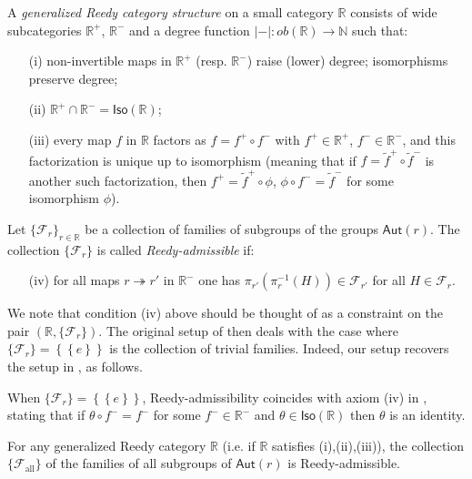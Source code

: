 \documentclass[a4paper,10pt
 ,draft
]{article}%
\begin{document}
\begin{definition}\label{GENRED DEF}
A \textit{generalized Reedy category structure} on a
small category $\mathbb{R}$ consists of
wide subcategories 
$\mathbb{R}^+$, $\mathbb{R}^-$
and a degree function $|\minus| \colon ob(\mathbb{R}) \to \mathbb{N}$ such that:
\begin{itemize}
	\item[(i)] non-invertible maps in $\mathbb{R}^+$ (resp. $\mathbb{R}^-$) raise (lower) degree; isomorphisms preserve degree;
	\item[(ii)] $\mathbb{R}^+ \cap \mathbb{R}^- = \mathsf{Iso}(\mathbb{R})$;
	\item[(iii)] every map $f$ in $\mathbb{R}$ factors as
	$f = f^{+} \circ f^{-}$ with $f^{+} \in \mathbb{R}^+$, $f^{-} \in \mathbb{R}^-$, and this factorization is unique up to isomorphism
	(meaning that if 
	$f = \tilde{f}^{+} \circ \tilde{f}^{-}$ is another such factorization, then
	$f^+ = \tilde{f}^+ \circ \phi$, $\phi \circ f^- = \tilde{f}^-$ for some isomorphism $\phi$).
\end{itemize}
Let $\{\mathcal{F}_r\}_{r \in \mathbb{R}}$
be a collection of families of subgroups of the groups $\mathsf{Aut}(r)$.
The collection $\{\mathcal{F}_r\}$ is called 
\textit{Reedy-admissible} if:
\begin{itemize}
	\item[(iv)] for all maps
	$r \twoheadrightarrow r'$ in $\mathbb{R}^-$ one has
	$\pi_{r'}\left( \pi_r^{-1} (H) \right) \in \mathcal{F}_{r'}$
	for all $H \in \mathcal{F}_r$.
\end{itemize}
\end{definition}

We note that condition (iv) above should be thought of as a constraint on the pair 
$(\mathbb{R},\{\mathcal{F}_r\})$.
The original setup of \cite{BM11} then deals with the case
where $\{ \mathcal{F}_r \} =
 \left\{ \left\{ e \right\} \right\}$
is the collection of trivial families. Indeed, our setup recovers
the setup in \cite{BM11}, as follows.

\begin{example}\label{RECAXIV EX}
	When $\{ \mathcal{F}_r \} =
 \left\{ \left\{ e \right\} \right\}$, Reedy-admissibility coincides with axiom (iv) in \cite[Def. 1.1]{BM11},
stating that if $\theta \circ f^{-} = f^{-}$
for some $f^- \in \mathbb{R}^{-}$ and 
$\theta \in \mathsf{Iso}(\mathbb{R})$ then $\theta$ is an identity.
\end{example}

\begin{example}
For any generalized Reedy category $\mathbb{R}$
(i.e. if $\mathbb{R}$ satisfies (i),(ii),(iii)),
the collection $\{\mathcal{F}_{\text{all}}\}$
of the families of all subgroups of $\mathsf{Aut}(r)$
is Reedy-admissible.
\end{example}
\end{document}
